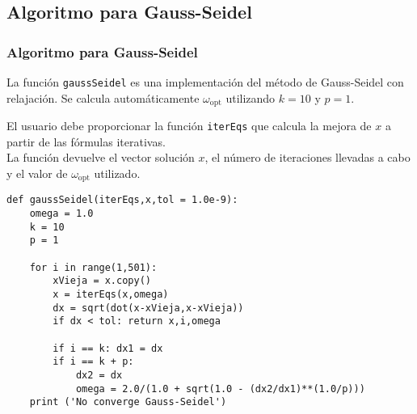 \subsection{Algoritmo para Gauss-Seidel}
\begin{frame}
\frametitle{Algoritmo para Gauss-Seidel}
La función \texttt{gaussSeidel} es una implementación del método de Gauss-Seidel con relajación. Se calcula automáticamente $\omega_{\mbox{opt}}$ utilizando $k = 10$ y $p = 1$.
\end{frame}
\begin{frame}
El usuario debe proporcionar la función \texttt{iterEqs} que calcula la mejora de $x$ a partir de las fórmulas iterativas. 
\\
\bigskip
La función devuelve el vector solución $x$, el número de iteraciones llevadas a cabo y el valor de $\omega_{\mbox{opt}}$ utilizado.
\end{frame}
\begin{frame}[fragile]
\begin{lstlisting}[basicstyle=\linespread{0.9}\ttfamily\normalsize, columns=fullflexible]
def gaussSeidel(iterEqs,x,tol = 1.0e-9):
    omega = 1.0
    k = 10
    p = 1
    
    for i in range(1,501):
        xVieja = x.copy()
        x = iterEqs(x,omega)
        dx = sqrt(dot(x-xVieja,x-xVieja))
        if dx < tol: return x,i,omega
        
        if i == k: dx1 = dx
        if i == k + p:
            dx2 = dx
            omega = 2.0/(1.0 + sqrt(1.0 - (dx2/dx1)**(1.0/p)))
	print ('No converge Gauss-Seidel')
\end{lstlisting} 
\end{frame}

